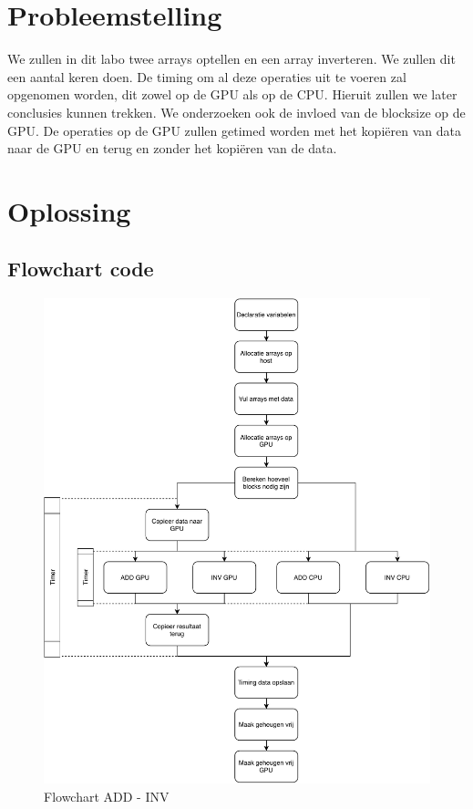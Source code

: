 \documentclass[twoside,a4paper]{article}
\begin{document}
\section{Probleemstelling}
We zullen in dit labo twee arrays optellen en een array inverteren. We zullen dit een aantal keren doen. De timing om al deze operaties uit te voeren zal opgenomen worden, dit zowel op de GPU als op de CPU. Hieruit zullen we later conclusies kunnen trekken. We onderzoeken ook de invloed van de blocksize op de GPU. De operaties op de GPU zullen getimed worden met het kopi\"eren van data naar de GPU en terug en zonder het kopi\"eren van de data.


\section{Oplossing}

\subsection{Flowchart code}

\begin{figure}[H]
    \centering
    \includegraphics[width=\columnwidth]{flowchart_inv_add.pdf}
    \caption{Flowchart ADD - INV}
    \label{fig:flowchart}
\end{figure}
\end{document}
